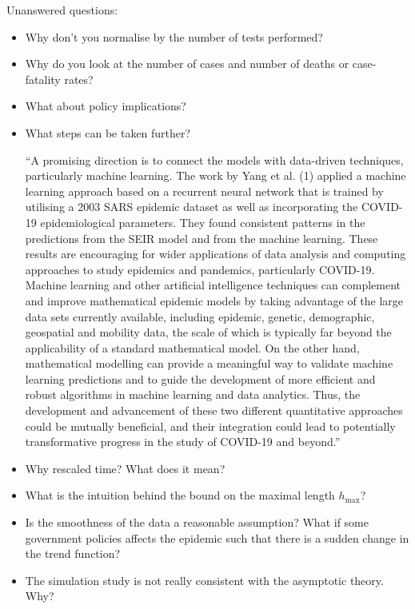 \documentclass[a4paper,12pt]{article}
\numberwithin{equation}{section}
\begin{document}
Unanswered questions:
\begin{itemize}


\item Why don't you normalise by the number of tests performed?
\item Why do you look at the number of cases and number of deaths or case-fatality rates?
\item What about policy implications?
\item What steps can be taken further?
	
	``A promising direction is to connect the models with data-driven techniques, particularly machine learning. The work by Yang et al. (1) applied a machine learning approach based on a recurrent neural network that is trained by utilising a 2003 SARS epidemic dataset as well as incorporating the COVID-19 epidemiological parameters. They found consistent patterns in the predictions from the SEIR model and from the machine learning. These results are encouraging for wider applications of data analysis and computing approaches to study epidemics and pandemics, particularly COVID-19. Machine learning and other artificial intelligence techniques can complement and improve mathematical epidemic models by taking advantage of the large data sets currently available, including epidemic, genetic, demographic, geospatial and mobility data, the scale of which is typically far beyond the applicability of a standard mathematical model. On the other hand, mathematical modelling can provide a meaningful way to validate machine learning predictions and to guide the development of more efficient and robust algorithms in machine learning and data analytics. Thus, the development and advancement of these two different quantitative approaches could be mutually beneficial, and their integration could lead to potentially transformative progress in the study of COVID-19 and beyond.''
\item Why rescaled time? What does it mean?
\item What is the intuition behind the bound on the maximal length $h_{\text{max}}$?
\item Is the smoothness of the data a reasonable assumption? What if some government policies affects the epidemic such that there is a sudden change in the trend function?
\item The simulation study is not really consistent with the asymptotic theory. Why?
\end{itemize}
\end{document}
